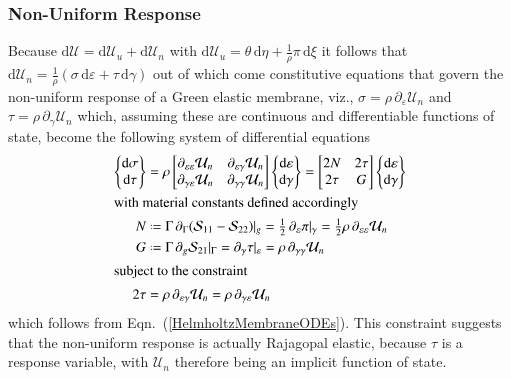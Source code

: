 \subsubsection{Non-Uniform Response}

Because $\mathrm{d} \mathcal{U} = \mathrm{d} \mathcal{U}_u + \mathrm{d} \mathcal{U}_n$ with $\mathrm{d} \mathcal{U}_u = \theta \, \mathrm{d} \eta + \tfrac{1}{\rho} \pi \, \mathrm{d} \xi$ it follows that $\mathrm{d} \mathcal{U}_n = \tfrac{1}{\rho} ( \sigma \, \mathrm{d} \varepsilon + \tau \, \mathrm{d} \gamma )$ out of which come constitutive equations that govern the non-uniform response of a Green elastic membrane, viz., $\sigma = \rho \, \partial_{\varepsilon} \mathcal{U}_n$ and $\tau = \rho \, \partial_{\gamma} \mathcal{U}_n$ which, assuming these are continuous and differentiable functions of state, become the following system of differential equations
\begin{subequations}
    \begin{align}
    \left\{ \begin{matrix}  
    \mathrm{d} \sigma \\ \mathrm{d} \tau
    \end{matrix} \right\} & = \rho \begin{bmatrix}
    \partial_{\varepsilon\varepsilon} \mathcal{U}_n & 
    \partial_{\varepsilon\gamma} \mathcal{U}_n \\
    \partial_{\gamma\varepsilon} \mathcal{U}_n &
    \partial_{\gamma\gamma} \mathcal{U}_n
    \end{bmatrix} \left\{ \begin{matrix}
    \mathrm{d} \varepsilon \\ \mathrm{d} \gamma
    \end{matrix} \right\} = \begin{bmatrix}
    2 N & 2 \tau \\ 
    2 \tau & G
    \end{bmatrix} \left\{ \begin{matrix}
    \mathrm{d} \varepsilon \\ \mathrm{d} \gamma
    \end{matrix} \right\} \\
    \intertext{with material constants defined accordingly}
    N & \defeq \Gamma \, \partial_{\Gamma} ( \mathcal{S}_{11} - \mathcal{S}_{22} ) |_g = \tfrac{1}{2} \, \partial_{\varepsilon} \pi |_{\gamma} = \tfrac{1}{2} \rho \, \partial_{\varepsilon\varepsilon} \mathcal{U}_n \\
    G & \defeq \Gamma \, \partial_g \mathcal{S}_{21} |_{\Gamma} = \partial_{\gamma} \tau |_{\varepsilon} = \rho \, \partial_{\gamma\gamma} \mathcal{U}_n \\
    \intertext{subject to the constraint}
    2\tau & = \rho \, \partial_{\varepsilon\gamma} \mathcal{U}_n = \rho \, \partial_{\gamma\varepsilon} \mathcal{U}_n
    \label{thermoConstraint}
    \end{align}
\end{subequations}
which follows from Eqn.~(\ref{HelmholtzMembraneODEs}).  This constraint suggests that the non-uniform response is actually Rajagopal elastic, because $\tau$ is a response variable, with $\mathcal{U}_n$ therefore being an implicit function of state.


